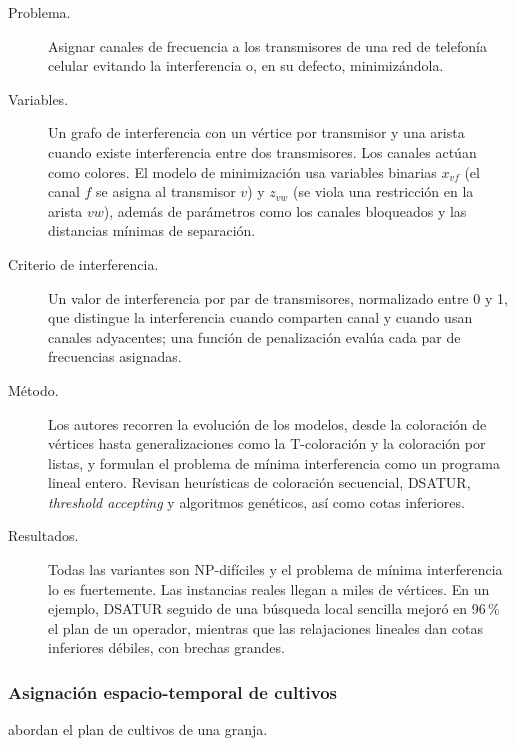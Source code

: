 \documentclass[11pt]{article}
\begin{document}
\begin{description}
  \item[Problema.] Asignar canales de frecuencia a los transmisores de una red de telefonía celular evitando la interferencia o, en su defecto, minimizándola.
  \item[Variables.] Un grafo de interferencia con un vértice por transmisor y una arista cuando existe interferencia entre dos transmisores. Los canales actúan como colores. El modelo de minimización usa variables binarias $x_{vf}$ (el canal $f$ se asigna al transmisor $v$) y $z_{vw}$ (se viola una restricción en la arista $vw$), además de parámetros como los canales bloqueados y las distancias mínimas de separación.
  \item[Criterio de interferencia.] Un valor de interferencia por par de transmisores, normalizado entre 0 y 1, que distingue la interferencia cuando comparten canal y cuando usan canales adyacentes; una función de penalización evalúa cada par de frecuencias asignadas.
  \item[Método.] Los autores recorren la evolución de los modelos, desde la coloración de vértices hasta generalizaciones como la T-coloración y la coloración por listas, y formulan el problema de mínima interferencia como un programa lineal entero. Revisan heurísticas de coloración secuencial, DSATUR, \textit{threshold accepting} y algoritmos genéticos, así como cotas inferiores.
  \item[Resultados.] Todas las variantes son NP-difíciles y el problema de mínima interferencia lo es fuertemente. Las instancias reales llegan a miles de vértices. En un ejemplo, DSATUR seguido de una búsqueda local sencilla mejoró en 96\,\% el plan de un operador, mientras que las relajaciones lineales dan cotas inferiores débiles, con brechas grandes.
\end{description}

\subsubsection{Asignación espacio-temporal de cultivos}

\textcite{akplogan2011} abordan el plan de cultivos de una granja.
\end{document}
